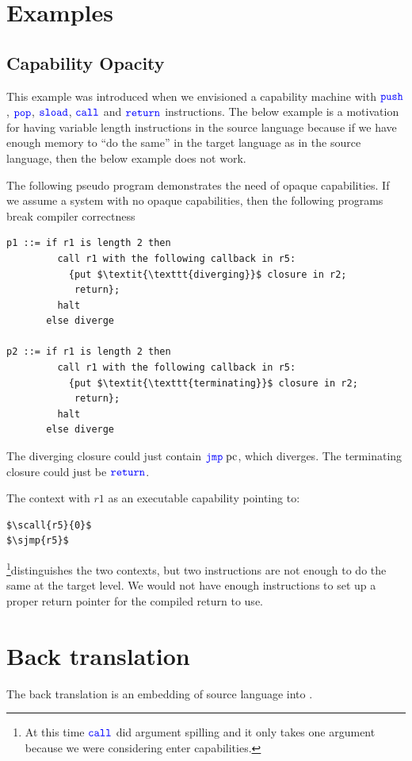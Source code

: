 \documentclass[a4paper]{article}
\newcommand{\sourcecolor}{\color{blue}}
\newcommand{\src}[1]{{\sourcecolor #1}}
\newcommand{\zinstr}[1]{\texttt{#1}}
\newcommand{\oneinstr}[2]{
  \ifthenelse{\equal{#2}{}}
  {\zinstr{#1}}
  {\zinstr{#1} \; #2}
}
\newcommand{\twoinstr}[3]{
  \ifthenelse{\equal{#2#3}{}}
  {\zinstr{#1}}
  {\zinstr{#1} \; #2 \; #3}
}
\newcommand{\sreturn}{\zinstr{\src{return}}}
\newcommand{\sjmp}[1]{\oneinstr{\src{jmp}}{#1}}
\newcommand{\spush}[1]{\oneinstr{\src{push}}{#1}}
\newcommand{\spop}[1]{\oneinstr{\src{pop}}{#1}}
\newcommand{\ssload}[2]{\twoinstr{\src{sload}}{#1}{#2}}
\newcommand{\scall}[2]{\twoinstr{\src{call}}{#1}{#2}}
\newcommand{\pcreg}{\mathrm{pc}}
\begin{document}
\clearpage
\section{Examples}
\subsection{Capability Opacity}
\label{subsec:capability-opacity}
This example was introduced when we envisioned a capability machine with $\spush{}$, $\spop{}$, $\ssload{}{}$, $\scall{}{}$ and $\sreturn$ instructions. The below example is a motivation for having variable length instructions in the source language because if we have enough memory to ``do the same'' in the target language as in the source language, then the below example does not work.

The following pseudo program demonstrates the need of opaque capabilities. If we assume a system with no opaque capabilities, then the following programs break compiler correctness
\begin{lstlisting}[basicstyle=\sourcecolor{}\ttfamily] 
p1 ::= if r1 is length 2 then
         call r1 with the following callback in r5:
           {put $\textit{\texttt{diverging}}$ closure in r2;
            return};
         halt
       else diverge

p2 ::= if r1 is length 2 then
         call r1 with the following callback in r5:
           {put $\textit{\texttt{terminating}}$ closure in r2;
            return};
         halt
       else diverge
\end{lstlisting}
The diverging closure could just contain $\sjmp{\pcreg}$, which diverges. The terminating closure could just be $\sreturn$.

The context with $r1$ as an executable capability pointing to:
\begin{lstlisting}[basicstyle=\sourcecolor{}\ttfamily] 
$\scall{r5}{0}$
$\sjmp{r5}$
\end{lstlisting}
\footnote{At this time $\scall{}{}$ did argument spilling and it only takes one argument because we were considering enter capabilities.}distinguishes the two contexts, but two instructions are not enough to do the same at the target level. We would not have enough instructions to set up a proper return pointer for the compiled return to use.

\clearpage
\section{Back translation}
The back translation is an embedding of source language into .
\end{document}
